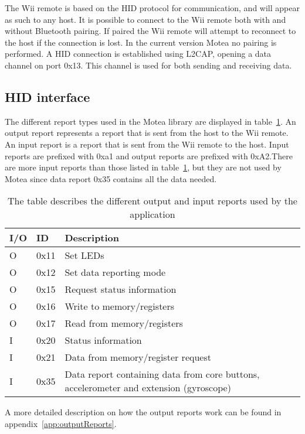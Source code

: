 The Wii remote is based on the HID protocol for communication, and will appear as such to any host. It is possible to connect to the Wii remote both with and without Bluetooth pairing. If paired the Wii remote will attempt to reconnect to the host if the connection is lost. In the current version Motea no pairing is performed. A HID connection is established using L2CAP, opening a data channel on port 0x13. This channel is used for both sending and receiving data.

\subsection{HID interface}
The different report types used in the Motea library are displayed in table~\ref{tab:hidInterface}. An output report represents a report that is sent from the host to the Wii remote. An input report is a report that is sent from the Wii remote to the host. Input reports are prefixed with 0xa1 and output reports are prefixed with 0xA2.There are more input reports than those listed in table~\ref{tab:hidInterface}, but they are not used by Motea since data report 0x35 contains all the data needed. 

\begin{table}[h!]
\centering
\begin{tabularx}{\textwidth}{|l|l|X|}
\hline
I/O & ID & Description \\ \hline
O & 0x11 & Set LEDs \\ \hline
O & 0x12 & Set data reporting mode \\ \hline
O & 0x15 & Request status information \\ \hline
O & 0x16 & Write to memory/registers \\ \hline
O & 0x17 & Read from memory/registers \\ \hline
I & 0x20 & Status information \\ \hline
I & 0x21 & Data from memory/register request \\ \hline
I & 0x35 & Data report containing data from core buttons, accelerometer and extension (gyroscope) \\ \hline
\end{tabularx}
\caption{\footnotesize The table describes the different output and input reports used by the application}
\label{tab:hidInterface}
\end{table}

A more detailed description on how the output reports work can be found in appendix~\ref{app:outputReports}.

